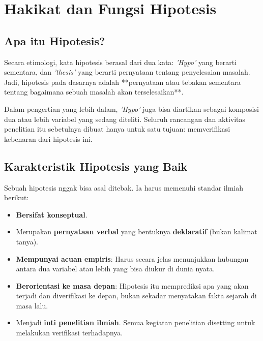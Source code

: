\documentclass[12pt,a4paper]{article}
\begin{document}
\newpage
\section{Hakikat dan Fungsi Hipotesis}

\subsection{Apa itu Hipotesis?}
Secara etimologi, kata hipotesis berasal dari dua kata: \textit{'Hypo'} yang berarti sementara, dan \textit{'thesis'} yang berarti pernyataan tentang penyelesaian masalah. Jadi, hipotesis pada dasarnya adalah **pernyataan atau tebakan sementara tentang bagaimana sebuah masalah akan terselesaikan**. 

Dalam pengertian yang lebih dalam, \textit{'Hypo'} juga bisa diartikan sebagai komposisi dua atau lebih variabel yang sedang diteliti. Seluruh rancangan dan aktivitas penelitian itu sebetulnya dibuat hanya untuk satu tujuan: memverifikasi kebenaran dari hipotesis ini.

\subsection{Karakteristik Hipotesis yang Baik}
Sebuah hipotesis nggak bisa asal ditebak. Ia harus memenuhi standar ilmiah berikut:
\begin{itemize}
    \item \textbf{Bersifat konseptual}.
    \item Merupakan \textbf{pernyataan verbal} yang bentuknya \textbf{deklaratif} (bukan kalimat tanya).
    \item \textbf{Mempunyai acuan empiris}: Harus secara jelas menunjukkan hubungan antara dua variabel atau lebih yang bisa diukur di dunia nyata.
    \item \textbf{Berorientasi ke masa depan}: Hipotesis itu memprediksi apa yang akan terjadi dan diverifikasi ke depan, bukan sekadar menyatakan fakta sejarah di masa lalu.
    \item Menjadi \textbf{inti penelitian ilmiah}. Semua kegiatan penelitian disetting untuk melakukan verifikasi terhadapnya.
\end{itemize}
\end{document}
